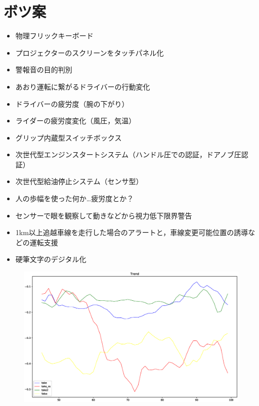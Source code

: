 \documentclass[a4j,twocolumn,10pt]{jarticle}
\begin{document}
\section{ボツ案}
\begin{itemize}
  \item 物理フリックキーボード
  \item プロジェクターのスクリーンをタッチパネル化
  \item 警報音の目的判別
  \item あおり運転に繋がるドライバーの行動変化
  \item ドライバーの疲労度（腕の下がり）
  \item ライダーの疲労度変化（風圧，気温）
  \item グリップ内蔵型スイッチボックス
  \item 次世代型エンジンスタートシステム（ハンドル圧での認証，ドアノブ圧認証）
  \item 次世代型給油停止システム（センサ型）
  \item 人の歩幅を使った何か…疲労度とか？
  \item センサーで眼を観察して動きなどから視力低下限界警告
  \item 1km以上追越車線を走行した場合のアラートと，車線変更可能位置の誘導などの運転支援
  \item 硬筆文字のデジタル化
\end{itemize}

\begin{figure}[t]
  \begin{center}
    \includegraphics[width=1\textwidth]{Figure_1.eps}
    \caption{}
    \label{fig}
  \end{center}
\end{figure}
\end{document}
